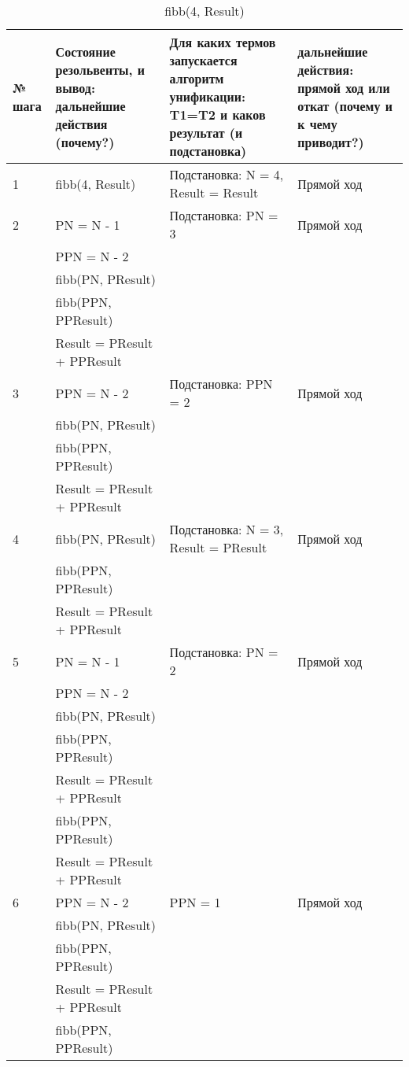 {
\small
\begin{longtable}{|p{1.15cm}|p{4cm}|p{6cm}|p{6cm}|}
    \caption{fibb(4, Result)} \\
    \hline
    № шага & Состояние резольвенты, и вывод: дальнейшие действия (почему?) & Для каких термов запускается алгоритм унификации: T1=T2 и каков результат (и подстановка) & дальнейшие действия: прямой ход или откат (почему и к чему приводит?) \\
    \hline
    1 & fibb(4, Result) & Подстановка: N = 4, Result = Result & Прямой ход \\
    \hline
    2 & PN = N - 1 & Подстановка: PN = 3 & Прямой ход \\
      & PPN = N - 2 & & \\
      & fibb(PN, PResult) & & \\
      & fibb(PPN, PPResult) & & \\
      & Result = PResult + PPResult & & \\
    \hline
    3 & PPN = N - 2 & Подстановка: PPN = 2 & Прямой ход \\
      & fibb(PN, PResult) & & \\
      & fibb(PPN, PPResult) & & \\
      & Result = PResult + PPResult & & \\
    \hline
    4 & fibb(PN, PResult) & Подстановка: N = 3, Result = PResult & Прямой ход \\
      & fibb(PPN, PPResult) & & \\
      & Result = PResult + PPResult & & \\
    \hline
    5 & PN = N - 1 & Подстановка: PN = 2 & Прямой ход \\
      & PPN = N - 2 & & \\
      & fibb(PN, PResult) & & \\
      & fibb(PPN, PPResult) & & \\
      & Result = PResult + PPResult & & \\
      & fibb(PPN, PPResult) & & \\
      & Result = PResult + PPResult & & \\
    \hline
    6 & PPN = N - 2 & PPN = 1 & Прямой ход \\
      & fibb(PN, PResult) & & \\
      & fibb(PPN, PPResult) & & \\
      & Result = PResult + PPResult & & \\
      & fibb(PPN, PPResult) & & \\

\end{longtable}}
